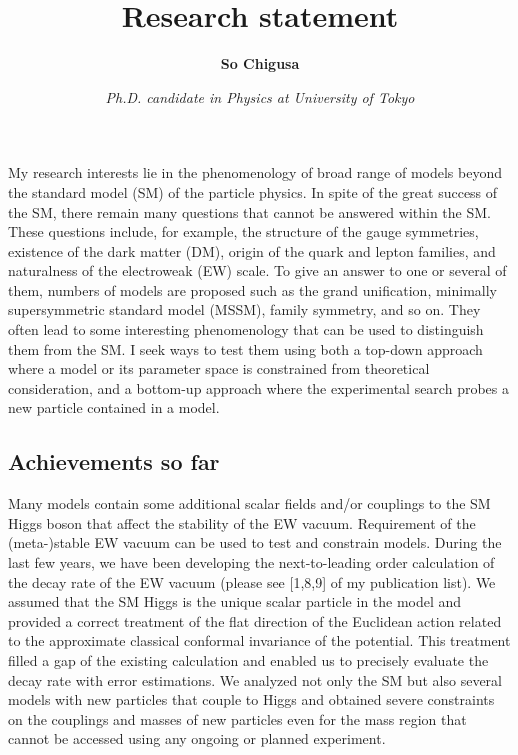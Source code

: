 \documentclass[12pt,notitlepage]{article}
\title{\vspace*{-3cm}Research statement}
\author{\textbf{So Chigusa}}
\date{\vspace*{-4mm}\textit{Ph.D. candidate in Physics at University of Tokyo}}
\begin{document}
\maketitle

My research interests lie in the phenomenology of broad range of models beyond the standard model (SM) of the particle physics.
In spite of the great success of the SM, there remain many questions that cannot be answered within the SM.
These questions include, for example, the structure of the gauge symmetries, existence of the dark matter (DM), origin of the quark and lepton families, and naturalness of the electroweak (EW) scale.
To give an answer to one or several of them, numbers of models are proposed such as the grand unification, minimally supersymmetric standard model (MSSM), family symmetry, and so on.
They often lead to some interesting phenomenology that can be used to distinguish them from the SM.
I seek ways to test them using both a top-down approach where a model or its parameter space is constrained from theoretical consideration, and a bottom-up approach where the experimental search probes a new particle contained in a model.

\vspace*{-2mm}
\subsection*{Achievements so far}


Many models contain some additional scalar fields and/or couplings to the SM Higgs boson that affect the stability of the EW vacuum.
Requirement of the (meta-)stable EW vacuum can be used to test and constrain models.
During the last few years, we have been developing the next-to-leading order calculation of the decay rate of the EW vacuum (please see [1,8,9] of my publication list).
We assumed that the SM Higgs is the unique scalar particle in the model and provided a correct treatment of the flat direction of the Euclidean action related to the approximate classical conformal invariance of the potential.
This treatment filled a gap of the existing calculation and enabled us to precisely evaluate the decay rate with error estimations.
We analyzed not only the SM but also several models with new particles that couple to Higgs and obtained severe constraints on the couplings and masses of new particles even for the mass region that cannot be accessed using any ongoing or planned experiment.
\end{document}
